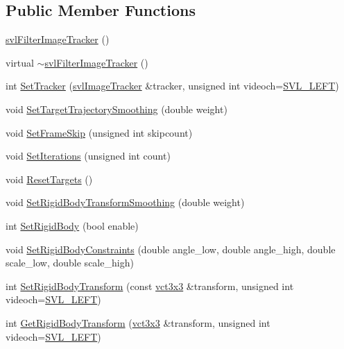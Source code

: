 \subsection*{Public Member Functions}
\begin{DoxyCompactItemize}
\item 
\hyperlink{classsvl_filter_image_tracker_ab2dc7279ace937d9c5f6eb2a5873478c}{svl\+Filter\+Image\+Tracker} ()
\item 
virtual \hyperlink{classsvl_filter_image_tracker_ab055ffc996ecc1bbb30d0ae5aa487996}{$\sim$svl\+Filter\+Image\+Tracker} ()
\item 
int \hyperlink{classsvl_filter_image_tracker_ad67f87d4d599bdd007fb04feb72e4c76}{Set\+Tracker} (\hyperlink{classsvl_image_tracker}{svl\+Image\+Tracker} \&tracker, unsigned int videoch=\hyperlink{svl_definitions_8h_ab9fec7615f19c8df2919eebcab0b187f}{S\+V\+L\+\_\+\+L\+E\+F\+T})
\item 
void \hyperlink{classsvl_filter_image_tracker_ad5a5d26c3cac21daa4843c956a7a73a3}{Set\+Target\+Trajectory\+Smoothing} (double weight)
\item 
void \hyperlink{classsvl_filter_image_tracker_a4a78d211c92d5550f7a7c6a6db90b65c}{Set\+Frame\+Skip} (unsigned int skipcount)
\item 
void \hyperlink{classsvl_filter_image_tracker_a3f6691e08e77208d1b0ca2897b082ac6}{Set\+Iterations} (unsigned int count)
\item 
void \hyperlink{classsvl_filter_image_tracker_a8713ac398b6be0683e08f951c1dd3640}{Reset\+Targets} ()
\item 
void \hyperlink{classsvl_filter_image_tracker_ab7d0a9024fd5fff744a1156265059315}{Set\+Rigid\+Body\+Transform\+Smoothing} (double weight)
\item 
int \hyperlink{classsvl_filter_image_tracker_a7726e5f7fdece4547d1ada917ac232d9}{Set\+Rigid\+Body} (bool enable)
\item 
void \hyperlink{classsvl_filter_image_tracker_a708a3eed66b321649fccd00382c5a82c}{Set\+Rigid\+Body\+Constraints} (double angle\+\_\+low, double angle\+\_\+high, double scale\+\_\+low, double scale\+\_\+high)
\item 
int \hyperlink{classsvl_filter_image_tracker_a7463ac2d5c83270eff29664830ee8a79}{Set\+Rigid\+Body\+Transform} (const \hyperlink{vct_fixed_size_matrix_types_8h_aac4a419dacf9282410675d42ebc86a7c}{vct3x3} \&transform, unsigned int videoch=\hyperlink{svl_definitions_8h_ab9fec7615f19c8df2919eebcab0b187f}{S\+V\+L\+\_\+\+L\+E\+F\+T})
\item 
int \hyperlink{classsvl_filter_image_tracker_a0ba68252868875613e4d7cb036706a56}{Get\+Rigid\+Body\+Transform} (\hyperlink{vct_fixed_size_matrix_types_8h_aac4a419dacf9282410675d42ebc86a7c}{vct3x3} \&transform, unsigned int videoch=\hyperlink{svl_definitions_8h_ab9fec7615f19c8df2919eebcab0b187f}{S\+V\+L\+\_\+\+L\+E\+F\+T})

\end{DoxyCompactItemize}
